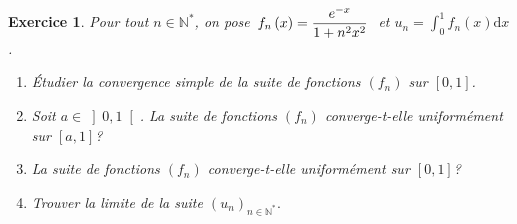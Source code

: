 \documentclass[12pt,a4paper]{article}
\newcommand{\R}{\mathbb{R}}
\theoremstyle{break}
\theoremstyle{break}
\newtheorem{Exo}{Exercice}
\begin{document}
%	
%	
%	
%	
\newpage
\begin{Exo}
	Pour tout $n\in \mathbb{N}^*$, on pose\ $f_{n}\left( x\right) =\dfrac{e^{-x}}{%
		1+n^{2}x^{2}}\ \ $et $u_{n}=\displaystyle\int_{0}^{1}f_{n}\left( x\right) \mathrm{d}x$.
	
	\begin{enumerate}
		\item \'Etudier la convergence simple de la suite de fonctions $\left( f_{n}\right) $  sur $[0,1]$.
		\item
		Soit $a\in\left] 0,1 \right[$.  La suite de  fonctions $\left( f_{n}\right) $ converge-t-elle uniformément sur $\left[a,1 \right]$? 
		\item
		La suite de  fonctions $\left( f_{n}\right) $ converge-t-elle uniformément   sur $[0,1]$?
		\item Trouver la limite de la suite $\left( u_{n}\right) _{n\in \mathbb{N}^*}.$
	\end{enumerate}
\end{Exo}
\end{document}

